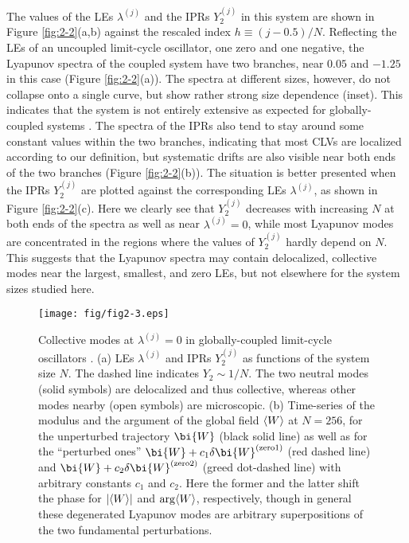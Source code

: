 \documentclass[12pt]{iopart}
\begin{document}
The values of the LEs $\lambda^{(j)}$ and the IPRs $Y_2^{(j)}$
 in this system are shown in Figure \ref{fig:2-2}(a,b)
 against the rescaled index $h \equiv (j-0.5)/N$.
Reflecting the LEs of an uncoupled limit-cycle oscillator,
 one zero and one negative, the Lyapunov spectra of the coupled system
 have two branches, near $0.05$ and $-1.25$ in this case
 (Figure \ref{fig:2-2}(a)).
The spectra at different sizes, however, do not collapse
 onto a single curve, but show rather strong size dependence (inset).
This indicates that the system is not entirely extensive
 as expected for globally-coupled systems \cite{Takeuchi.etal-PRL2011}.
The spectra of the IPRs also tend to stay around some constant values
 within the two branches, indicating that most CLVs are localized
 according to our definition, but systematic drifts are also visible
 near both ends of the two branches (Figure \ref{fig:2-2}(b)).
The situation is better presented when the IPRs $Y_2^{(j)}$
 are plotted against the corresponding LEs $\lambda^{(j)}$,
 as shown in Figure \ref{fig:2-2}(c).
Here we clearly see that $Y_2^{(j)}$ decreases with increasing $N$
 at both ends of the spectra as well as near $\lambda^{(j)}=0$,
 while most Lyapunov modes are concentrated in the regions
 where the values of $Y_2^{(j)}$ hardly depend on $N$.
This suggests that the Lyapunov spectra may contain
 delocalized, collective modes near the largest, smallest, and zero LEs,
 but not elsewhere for the system sizes studied here.

\begin{figure}[t]
 \begin{center}
  \texttt{[image: fig/fig2-3.eps]}
  \caption{Collective modes at $\lambda^{(j)} = 0$ in globally-coupled
  limit-cycle oscillators . (a) LEs $\lambda^{(j)}$ and
  IPRs $Y_2^{(j)}$ as functions of the system size $N$. The dashed line
  indicates $Y_2 \sim 1/N$. The two neutral modes (solid symbols) are
  delocalized and thus collective, whereas other modes nearby (open
  symbols) are microscopic. (b) Time-series of the modulus and the
  argument of the global field $\langle W \rangle$ at $N=256$, for the
  unperturbed trajectory $\bi{W}$ (black solid line) as well as for the
  ``perturbed ones'' $\bi{W}+c_1\delta\bi{W}^{\mathrm{(zero1)}}$ (red
  dashed line) and $\bi{W}+c_2\delta\bi{W}^{\mathrm{(zero2)}}$ (greed
  dot-dashed line) with arbitrary constants $c_1$ and $c_2$. Here the
  former and the latter shift the phase for $|\langle W \rangle|$ and
  $\arg\langle W \rangle$, respectively, though in general these degenerated
  Lyapunov modes are arbitrary superpositions of the two fundamental
  perturbations.}
  \label{fig:2-3}
 \end{center}
\end{figure}%
\end{document}
